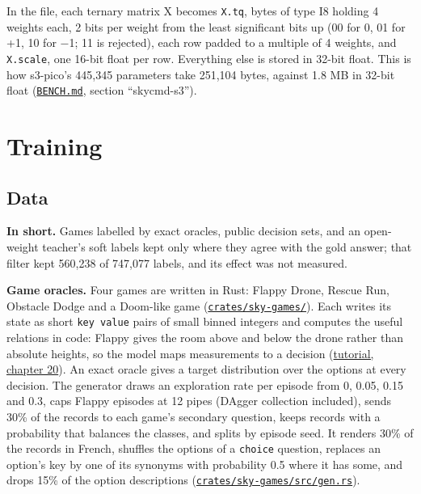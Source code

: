 \documentclass[10pt]{article}
\begin{document}
In the file, each ternary matrix X becomes \texttt{X.tq}, bytes of type I8 holding 4 weights each, 2 bits per weight from the least significant bits up (00 for 0, 01 for +1, 10 for $-$1; 11 is rejected), each row padded to a multiple of 4 weights, and \texttt{X.scale}, one 16-bit float per row. Everything else is stored in 32-bit float. This is how s3-pico's 445,345 parameters take 251,104 bytes, against 1.8 MB in 32-bit float (\href{https://github.com/maxgfr/skycmd/blob/main/BENCH.md}{\texttt{BENCH.md}}, section ``skycmd-s3'').

\section{Training}\label{sec:4}

\subsection{Data}\label{sec:4.1}

\textbf{In short.} Games labelled by exact oracles, public decision sets, and an open-weight teacher's soft labels kept only where they agree with the gold answer; that filter kept 560,238 of 747,077 labels, and its effect was not measured.

\textbf{Game oracles.} Four games are written in Rust: Flappy Drone, Rescue Run, Obstacle Dodge and a Doom-like game (\href{https://github.com/maxgfr/skycmd/tree/main/crates/sky-games}{\texttt{crates/\allowbreak{}sky-games/\allowbreak{}}}). Each writes its state as short \texttt{key value} pairs of small binned integers and computes the useful relations in code: Flappy gives the room above and below the drone rather than absolute heights, so the model maps measurements to a decision (\href{https://maxgfr.github.io/skycmd/tutorial/20-dagger-lessons}{tutorial, chapter 20}). An exact oracle gives a target distribution over the options at every decision. The generator draws an exploration rate per episode from 0, 0.05, 0.15 and 0.3, caps Flappy episodes at 12 pipes (DAgger collection included), sends 30\% of the records to each game's secondary question, keeps records with a probability that balances the classes, and splits by episode seed. It renders 30\% of the records in French, shuffles the options of a \texttt{choice} question, replaces an option's key by one of its synonyms with probability 0.5 where it has some, and drops 15\% of the option descriptions (\href{https://github.com/maxgfr/skycmd/blob/main/crates/sky-games/src/gen.rs}{\texttt{crates/\allowbreak{}sky-games/\allowbreak{}src/\allowbreak{}gen.rs}}).
\end{document}
